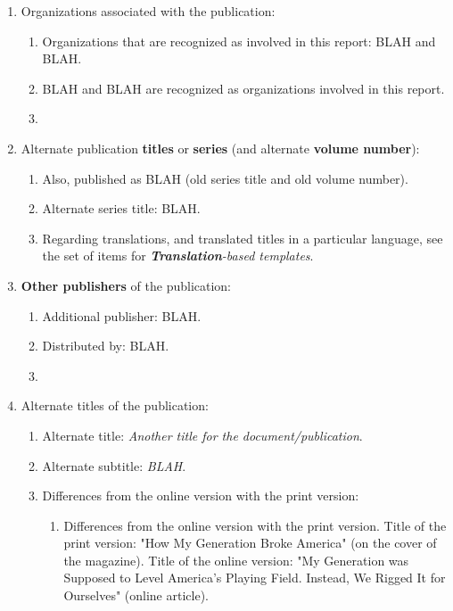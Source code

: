 \documentclass[letter,12pt]{article}
\begin{document}
\begin{enumerate}
\begin{enumerate}
\begin{enumerate}
		\end{enumerate}
	\item Organizations associated with the publication: \vspace{-0.2cm}
		\begin{enumerate} \itemsep -2pt
		\item Organizations that are recognized as involved in this report: BLAH and BLAH.
		\item BLAH and BLAH are recognized as organizations involved in this report.
		\item 
		\end{enumerate}
	\item Alternate publication {\bf titles} or {\bf series} (and alternate {\bf volume number}): \vspace{-0.2cm}
		\begin{enumerate} \itemsep -2pt
		\item Also, published as BLAH (old series title and old volume number).
		\item Alternate series title: BLAH.
		\item Regarding translations, and translated titles in a particular language, see the set of items for {\it {\bf Translation}-based templates}.
		\end{enumerate}
	\item {\bf Other publishers} of the publication: \vspace{-0.2cm}
		\begin{enumerate} \itemsep -2pt
		\item Additional publisher: BLAH.
		\item Distributed by: BLAH.
		\item 
		\end{enumerate}
	\item Alternate titles of the publication: \vspace{-0.2cm}
		\begin{enumerate} \itemsep -2pt
		\item Alternate title: {\it Another title for the document/publication}.
		\item Alternate subtitle: {\it BLAH}.
		\item Differences from the online version with the print version: \vspace{-0.1cm}
			\begin{enumerate} \itemsep -1pt
			\item Differences from the online version with the print version. Title of the print version: "How My Generation Broke America" (on the cover of the magazine). Title of the online version: "My Generation was Supposed to Level America's Playing Field. Instead, We Rigged It for Ourselves" (online article).

\end{enumerate}
\end{enumerate}
\end{enumerate}
\end{enumerate}
\end{document}
